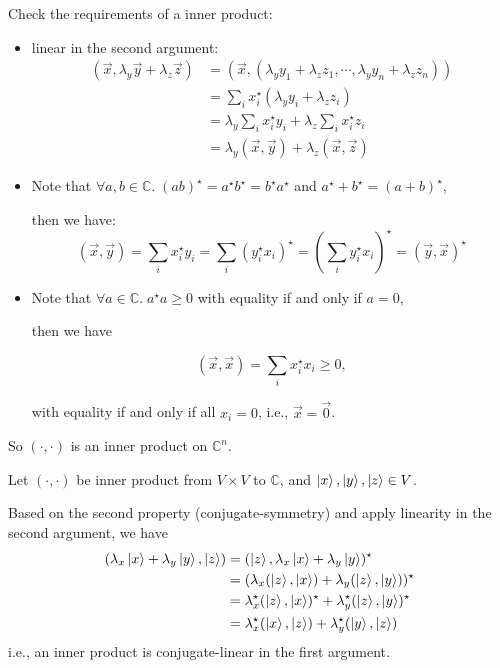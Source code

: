 \documentclass{homeworg}
\begin{document}
Check the requirements of a inner product:
\begin{itemize}
    \item linear in the second argument:
    \begin{align}
    (\vec{x},\lambda_y \vec{y} +\lambda_z \vec{z})&=(\vec{x},(\lambda_y y_1 +\lambda_z z_1,\cdots,\lambda_y y_n +\lambda_z z_n))\nonumber\\
    &=\sum_i x_i^\star (\lambda_y y_i +\lambda_z z_i)\nonumber\\
    &=\lambda_y\sum_i x_i^\star y_i + \lambda_z\sum_i x_i^\star z_i\nonumber\\
    &=\lambda_y(\vec{x},\vec{y})+\lambda_z(\vec{x},\vec{z})\nonumber
    \end{align}
    \item Note that $\forall{a,b}\in \mathbb{C}.\;(ab)^\star=a^\star b^\star = b^\star a^\star$ and $a^\star + b^\star = (a+b)^\star$,
    
    then we have:
    \[(\vec{x},\vec{y})=\sum_i x_i^\star y_i=\sum_i (y_i^\star x_i)^\star=(\sum_i y_i^\star x_i)^\star=(\vec{y},\vec{x})^\star\]
    \item  Note that $\forall{a}\in \mathbb{C}.\;a^\star a\geq 0$ with equality if and only if $a=0$,
    
    then we have
    
    \[(\vec{x},\vec{x})=\sum_i x_i^\star x_i\geq 0,\]
    
    with equality if and only if all $x_i=0$, i.e., $\vec{x}=\vec{0}$.
    
\end{itemize}
So $(\cdot,\cdot)$ is an inner product on $\mathbb{C}^n$.

\exercise*

Let $(\cdot,\cdot)$ be inner product from $V\times V$ to $\mathbb{C}$, and $\ket{x},\ket{y},\ket{z}\in V$.

Based on the second property (conjugate-symmetry) and apply linearity in the second argument, we have
\begin{align}
    (\lambda_x\ket{x}+\lambda_y \ket{y},\ket{z})&=(\ket{z},\lambda_x\ket{x}+\lambda_y \ket{y})^\star\nonumber\\
    &=(\lambda_x(\ket{z},\ket{x})+\lambda_y(\ket{z},\ket{y}))^\star\nonumber\\
    &=\lambda_x^\star(\ket{z},\ket{x})^\star + \lambda_y^\star(\ket{z},\ket{y})^\star\nonumber\\
    &=\lambda_x^\star(\ket{x},\ket{z}) + \lambda_y^\star(\ket{y},\ket{z})\nonumber
\end{align}
i.e., an inner product is conjugate-linear in the first
 argument.
\end{document}

